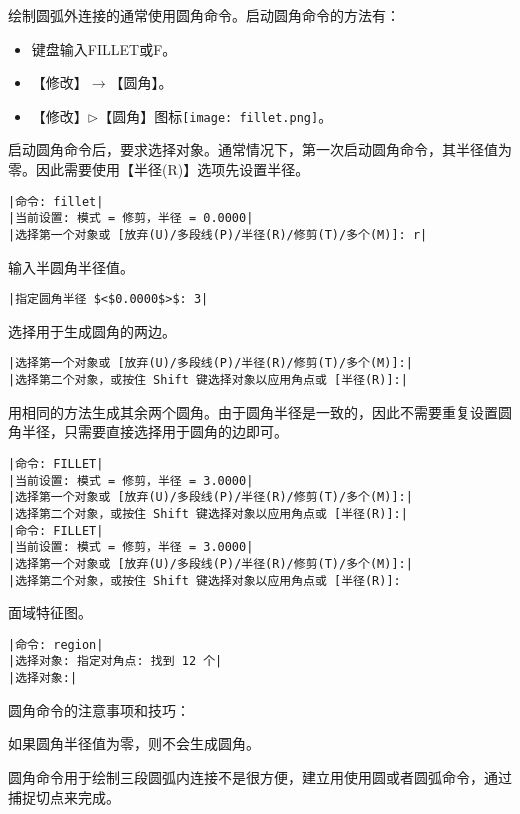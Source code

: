 \begin{procedure}
绘制圆弧外连接的通常使用圆角命令。启动圆角命令的方法有：
\begin{itemize}
\item 键盘输入FILLET或F。
\item 【修改】$\rightarrow$【圆角】。
\item 【修改】$\triangleright$【圆角】图标\texttt{[image: fillet.png]}。
\end{itemize}
启动圆角命令后，要求选择对象。通常情况下，第一次启动圆角命令，其半径值为零。因此需要使用【半径(R)】选项先设置半径。
\begin{lstlisting}
|命令: fillet|
|当前设置: 模式 = 修剪，半径 = 0.0000|
|选择第一个对象或 [放弃(U)/多段线(P)/半径(R)/修剪(T)/多个(M)]: r| 
\end{lstlisting}
输入半圆角半径值。
\begin{lstlisting}
|指定圆角半径 $<$0.0000$>$: 3|
\end{lstlisting}
选择用于生成圆角的两边。
\begin{lstlisting}
|选择第一个对象或 [放弃(U)/多段线(P)/半径(R)/修剪(T)/多个(M)]:|
|选择第二个对象，或按住 Shift 键选择对象以应用角点或 [半径(R)]:|
\end{lstlisting}
用相同的方法生成其余两个圆角。由于圆角半径是一致的，因此不需要重复设置圆角半径，只需要直接选择用于圆角的边即可。
\begin{lstlisting}
|命令: FILLET|
|当前设置: 模式 = 修剪，半径 = 3.0000|
|选择第一个对象或 [放弃(U)/多段线(P)/半径(R)/修剪(T)/多个(M)]:|
|选择第二个对象，或按住 Shift 键选择对象以应用角点或 [半径(R)]:|
|命令: FILLET|
|当前设置: 模式 = 修剪，半径 = 3.0000|
|选择第一个对象或 [放弃(U)/多段线(P)/半径(R)/修剪(T)/多个(M)]:|
|选择第二个对象，或按住 Shift 键选择对象以应用角点或 [半径(R)]:
\end{lstlisting}
\item 面域特征图。
\begin{lstlisting}
|命令: region|
|选择对象: 指定对角点: 找到 12 个|
|选择对象:|
\end{lstlisting}
\end{procedure}
圆角命令的注意事项和技巧：
\begin{tips}
\item 如果圆角半径值为零，则不会生成圆角。
\item 圆角命令用于绘制三段圆弧内连接不是很方便，建立用使用圆或者圆弧命令，通过捕捉切点来完成。
\end{tips}

\endinput
